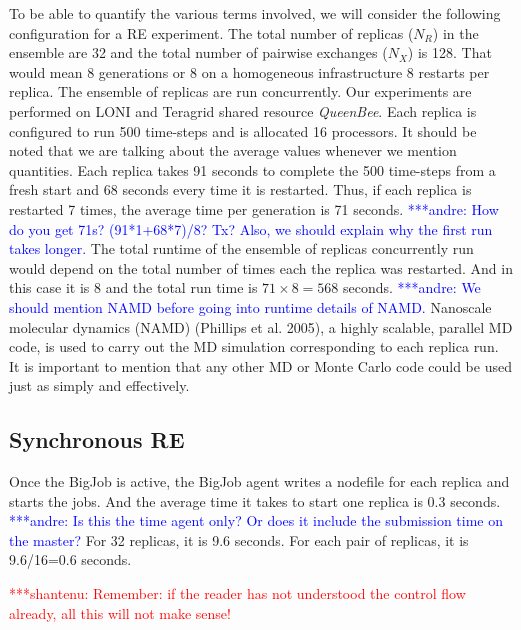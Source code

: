 \documentclass{rspublic}
\newcommand{\jhanote}[1]{ {\textcolor{red} { ***shantenu: #1 }}}
\newcommand{\alnote}[1]{ {\textcolor{blue} { ***andre: #1 }}}
\newcommand{\alnote}[1]{}
\newcommand{\jhanote}[1]{}
\begin{document}
To be able to quantify the various terms involved, we will consider the
following configuration for a RE experiment. The total number of replicas ($N_R$) in the
ensemble are 32 and the total number of pairwise exchanges ($N_X$) is
128. That would mean 8 generations or 8 on a homogeneous
infrastructure 8 restarts per replica. The ensemble of replicas are run
concurrently. Our experiments are performed on LONI and Teragrid
shared resource \emph{QueenBee}. Each replica is configured to run 500
time-steps and is allocated 16 processors. It should be noted that we are
talking about the average values whenever we mention quantities. Each
replica takes 91 seconds to complete the 500 time-steps from a fresh
start and 68 seconds every time it is restarted. Thus, if each replica
is restarted 7 times, the average time per generation is 71
seconds. \alnote{How do you get 71s? (91*1+68*7)/8? Tx? 
Also, we should explain why the first run takes longer.} 
The total runtime of the ensemble of replicas concurrently
run would depend on the total number of times each the replica was
restarted. And in this case it is 8 and the total run time is $71
\times 8 = 568$ seconds. \alnote{We should mention NAMD before going into runtime details of NAMD.}
Nanoscale molecular dynamics (NAMD) (Phillips et al.
2005), a highly scalable, parallel MD code, is used to carry out the MD simulation
corresponding to each replica run. It is important to mention that any other MD or
Monte Carlo code could be used just as simply and effectively.

\subsection{Synchronous RE}


Once the BigJob is active, the BigJob agent writes a
nodefile for each replica and starts the jobs. And the average time
it takes to start one replica is 0.3 seconds. 
\alnote{Is this the time agent only? Or does it include the submission time on the master?}
For 32 replicas, it is
9.6 seconds. For each pair of replicas, it is 9.6/16=0.6 seconds.

\jhanote{Remember: if the reader has not understood the control flow
  already, all this will not make sense!}
\end{document}
